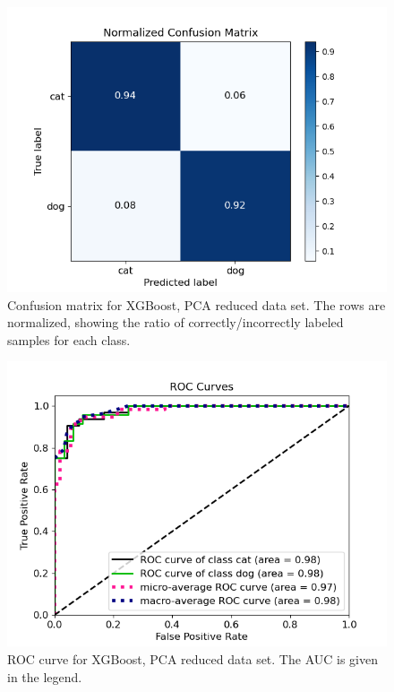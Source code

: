 \documentclass[a4paper]{article}
\begin{document}
\begin{figure}[H]
	\centering
	\includegraphics[scale=0.6]{../figures/xgboost/confusion_matrix_nbins200_pca35_seed4155_ts0.20.png}
	\caption{Confusion matrix for XGBoost, PCA reduced data set. The rows are normalized, showing the ratio of correctly/incorrectly labeled samples for each class.}
	\label{fig:xgboost_confusion_pca}
\end{figure}	

\begin{figure}[H]
	\centering
	\includegraphics[scale=0.5]{../figures/xgboost/roc_nbins200_pca35_seed4155_ts0.20.png}
	\caption{ROC curve for XGBoost, PCA reduced data set. The AUC is given in the legend.}
	\label{fig:xgboost_roc_pca}
\end{figure}	
\end{document}
